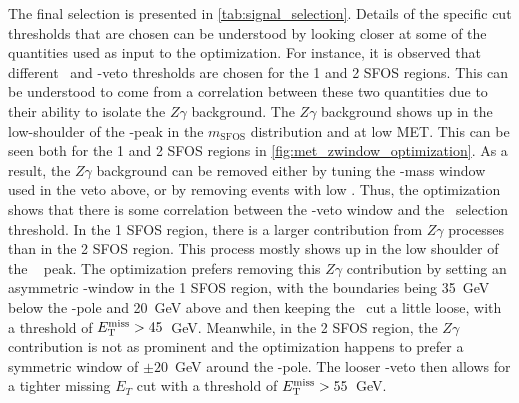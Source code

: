 The final selection is presented in \tab\ref{tab:signal_selection}.
Details of the specific cut thresholds that are chosen can be understood
by looking closer at some of the quantities used as input to 
the optimization. For instance, it is observed that
different \MET~and \z-veto thresholds are chosen for the 1 and 2 SFOS
regions. This can be understood to come from a correlation between
these two quantities due to their ability to isolate the $Z\gamma$
background.
The $Z\gamma$ background shows up in the low-shoulder of the \z-peak
in the $m_{\textrm{SFOS}}$ distribution and at low MET. This can be
seen both for the 1 and 2 SFOS regions in \fig\ref{fig:met_zwindow_optimization}.
As a result, the $Z\gamma$ background can be removed either by tuning 
the \z-mass window used in the veto above, or by removing events with low \met.
Thus, the optimization shows that there is some correlation 
between the \z-veto window and the \met~selection threshold. 
In the 1 SFOS region, there is a larger 
contribution from $Z\gamma$ processes than in the 2 SFOS
region.  This process mostly shows up in the low shoulder 
of the \z~ peak. The optimization
prefers removing this $Z\gamma$ contribution by setting an 
asymmetric \z-window in the 1 SFOS
region, with the boundaries being 35~GeV below the \z-pole 
and 20~GeV above and then keeping the \MET~cut a little loose, with a 
threshold of $E_{\mathrm{T}}^{\mathrm{miss}} > 45$~GeV.  Meanwhile, in the 2 SFOS region,
the $Z\gamma$ contribution is not as prominent and the 
optimization happens to prefer a symmetric
window of $\pm20$~GeV around the \z-pole.  
The looser \z-veto then allows for a tighter
missing $E_{T}$ cut with a threshold of $E_{\mathrm{T}}^{\mathrm{miss}} > 55$~GeV. 


